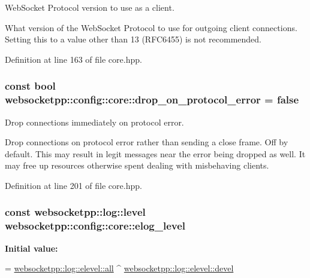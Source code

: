 Web\+Socket Protocol version to use as a client. 

What version of the Web\+Socket Protocol to use for outgoing client connections. Setting this to a value other than 13 (R\+F\+C6455) is not recommended. 

Definition at line 163 of file core.\+hpp.

\subsubsection[{\texorpdfstring{drop\+\_\+on\+\_\+protocol\+\_\+error}{drop\_on\_protocol\_error}}]{\setlength{\rightskip}{0pt plus 5cm}const bool websocketpp\+::config\+::core\+::drop\+\_\+on\+\_\+protocol\+\_\+error = false\hspace{0.3cm}{\ttfamily [static]}}\hypertarget{structwebsocketpp_1_1config_1_1core_aa103c2e42ba4c43a34e918048b478890}{}\label{structwebsocketpp_1_1config_1_1core_aa103c2e42ba4c43a34e918048b478890}


Drop connections immediately on protocol error. 

Drop connections on protocol error rather than sending a close frame. Off by default. This may result in legit messages near the error being dropped as well. It may free up resources otherwise spent dealing with misbehaving clients. 

Definition at line 201 of file core.\+hpp.

\subsubsection[{\texorpdfstring{elog\+\_\+level}{elog\_level}}]{\setlength{\rightskip}{0pt plus 5cm}const websocketpp\+::log\+::level websocketpp\+::config\+::core\+::elog\+\_\+level\hspace{0.3cm}{\ttfamily [static]}}\hypertarget{structwebsocketpp_1_1config_1_1core_a31a33f2fdcf9cabf04995367ce473c77}{}\label{structwebsocketpp_1_1config_1_1core_a31a33f2fdcf9cabf04995367ce473c77}
{\bfseries Initial value\+:}
\begin{DoxyCode}
=
        \hyperlink{structwebsocketpp_1_1log_1_1elevel_a9b31ff708c221d314f9f4eb3ff2b1ad7}{websocketpp::log::elevel::all} ^ 
      \hyperlink{structwebsocketpp_1_1log_1_1elevel_a0b1dbc650c6f2711522c096496423726}{websocketpp::log::elevel::devel}
\end{DoxyCode}


